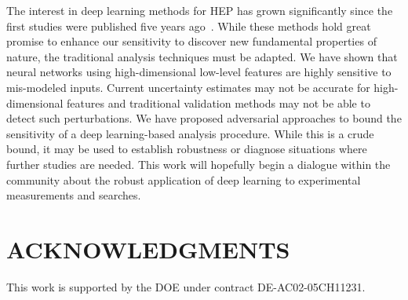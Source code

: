\documentclass[reprint,nofootinbib,...]{revtex4-1}
\begin{document}
The interest in deep learning methods for HEP has grown significantly since the first studies were published five years ago~\cite{Baldi:2014kfa}.  While these methods hold great promise to enhance our sensitivity to discover new fundamental properties of nature, the traditional analysis techniques must be adapted.  We have shown that neural networks using high-dimensional low-level features are highly sensitive to mis-modeled inputs.  Current uncertainty estimates may not be accurate for high-dimensional features and traditional validation methods may not be able to detect such perturbations.  We have proposed adversarial approaches to bound the sensitivity of a deep learning-based analysis procedure.  While this is a crude bound, it may be used to establish robustness or diagnose situations where further studies are needed.  This work will hopefully begin a dialogue within the community about the robust application of deep learning to experimental measurements and searches.

\section*{ACKNOWLEDGMENTS}

This work is supported by the DOE under contract DE-AC02-05CH11231. 


\end{document}
